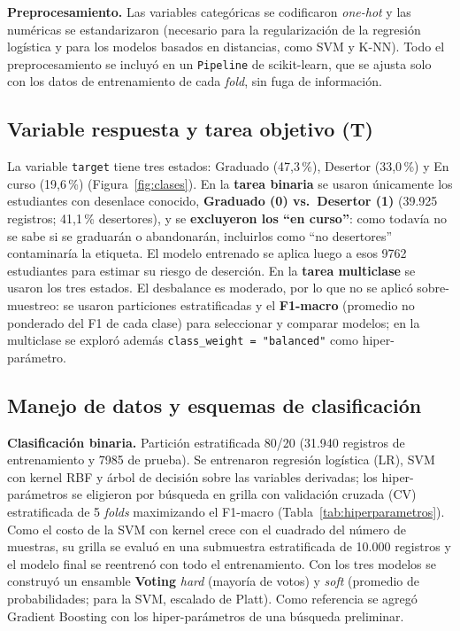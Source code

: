 \documentclass[titlepage,a4paper]{article}
\newcommand{\code}[1]{\texttt{#1}}
\begin{document}
\textbf{Preprocesamiento.} Las variables categóricas se codificaron \textit{one-hot} y las numéricas se estandarizaron (necesario para la regularización de la regresión logística y para los modelos basados en distancias, como SVM y K-NN). Todo el preprocesamiento se incluyó en un \code{Pipeline} de scikit-learn, que se ajusta solo con los datos de entrenamiento de cada \textit{fold}, sin fuga de información.

\subsection{Variable respuesta y tarea objetivo (T)}

La variable \code{target} tiene tres estados: Graduado (47,3\,\%), Desertor (33,0\,\%) y En curso (19,6\,\%) (Figura~\ref{fig:clases}). En la \textbf{tarea binaria} se usaron únicamente los estudiantes con desenlace conocido, \textbf{Graduado (0) vs.\ Desertor (1)} (39.925 registros; 41,1\,\% desertores), y se \textbf{excluyeron los ``en curso''}: como todavía no se sabe si se graduarán o abandonarán, incluirlos como ``no desertores'' contaminaría la etiqueta. El modelo entrenado se aplica luego a esos 9762 estudiantes para estimar su riesgo de deserción. En la \textbf{tarea multiclase} se usaron los tres estados. El desbalance es moderado, por lo que no se aplicó sobre-muestreo: se usaron particiones estratificadas y el \textbf{F1-macro} (promedio no ponderado del F1 de cada clase) para seleccionar y comparar modelos; en la multiclase se exploró además \code{class\_weight = "balanced"} como hiper-parámetro.

\subsection{Manejo de datos y esquemas de clasificación}

\textbf{Clasificación binaria.} Partición estratificada 80/20 (31.940 registros de entrenamiento y 7985 de prueba). Se entrenaron regresión logística (LR), SVM con kernel RBF y árbol de decisión sobre las variables derivadas; los hiper-parámetros se eligieron por búsqueda en grilla con validación cruzada (CV) estratificada de 5 \textit{folds} maximizando el F1-macro (Tabla~\ref{tab:hiperparametros}). Como el costo de la SVM con kernel crece con el cuadrado del número de muestras, su grilla se evaluó en una submuestra estratificada de 10.000 registros y el modelo final se reentrenó con todo el entrenamiento. Con los tres modelos se construyó un ensamble \textbf{Voting} \textit{hard} (mayoría de votos) y \textit{soft} (promedio de probabilidades; para la SVM, escalado de Platt). Como referencia se agregó Gradient Boosting con los hiper-parámetros de una búsqueda preliminar.
\end{document}
